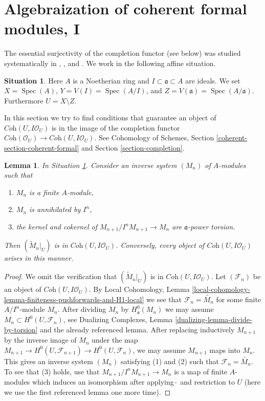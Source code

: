 \documentclass{stacks-project}
\theoremstyle{plain}
\newtheorem{lemma}[subsection]{Lemma}
\theoremstyle{definition}
\newtheorem{situation}[subsection]{Situation}
\theoremstyle{remark}
\numberwithin{equation}{subsection}
\def\Spec{\mathop{\mathrm{Spec}}}
\begin{document}
\section{Algebraization of coherent formal modules, I}
\label{section-algebraization-modules}

\noindent
The essential surjectivity of the completion functor (see below)
was studied systematically in
\cite{SGA2}, \cite{MRaynaud-book}, and \cite{MRaynaud-paper}.
We work in the following affine situation.

\begin{situation}
\label{situation-algebraize}
Here $A$ is a Noetherian ring and $I \subset \mathfrak a \subset A$ are ideals.
We set $X = \Spec(A)$, $Y = V(I) = \Spec(A/I)$, and
$Z = V(\mathfrak a) = \Spec(A/\mathfrak a)$. Furthermore $U = X \setminus Z$.
\end{situation}

\noindent
In this section we try to find conditions that guarantee an object
of $\textit{Coh}(U, I\mathcal{O}_U)$ is in the image of the completion functor
$\textit{Coh}(\mathcal{O}_U) \to \textit{Coh}(U, I\mathcal{O}_U)$.
See Cohomology of Schemes, Section \ref{coherent-section-coherent-formal} and
Section \ref{section-completion}.

\begin{lemma}
\label{lemma-system-of-modules}
In Situation \ref{situation-algebraize}.
Consider an inverse system $(M_n)$ of $A$-modules such
that
\begin{enumerate}
\item $M_n$ is a finite $A$-module,
\item $M_n$ is annihilated by $I^n$,
\item the kernel and cokernel of $M_{n + 1}/I^nM_{n + 1} \to M_n$
are $\mathfrak a$-power torsion.
\end{enumerate}
Then $(\widetilde{M}_n|_U)$ is in $\textit{Coh}(U, I\mathcal{O}_U)$.
Conversely, every object of $\textit{Coh}(U, I\mathcal{O}_U)$
arises in this manner.
\end{lemma}

\begin{proof}
We omit the verification that $(\widetilde{M}_n|_U)$ is in
$\textit{Coh}(U, I\mathcal{O}_U)$. Let $(\mathcal{F}_n)$
be an object of $\textit{Coh}(U, I\mathcal{O}_U)$.
By Local Cohomology, Lemma
\ref{local-cohomology-lemma-finiteness-pushforwards-and-H1-local}
we see that $\mathcal{F}_n = \widetilde{M_n}$ for some finite
$A/I^n$-module $M_n$. After dividing $M_n$ by $H^0_\mathfrak a(M_n)$
we may assume $M_n \subset H^0(U, \mathcal{F}_n)$, see
Dualizing Complexes, Lemma \ref{dualizing-lemma-divide-by-torsion}
and the already referenced lemma.
After replacing inductively $M_{n + 1}$ by the inverse image
of $M_n$ under the map $M_{n + 1} \to H^0(U, \mathcal{F}_{n + 1})
\to H^0(U, \mathcal{F}_n)$, we may assume $M_{n + 1}$ maps into
$M_n$. This gives an inverse system $(M_n)$ satisfying (1) and (2)
such that $\mathcal{F}_n = \widetilde{M_n}$. To see that (3)
holds, use that $M_{n + 1}/I^nM_{n + 1} \to M_n$ is a map
of finite $A$-modules which induces an isomorphism after
applying $\widetilde{\ }$ and restriction to $U$
(here we use the first referenced lemma one more time).
\end{proof}
\end{document}
